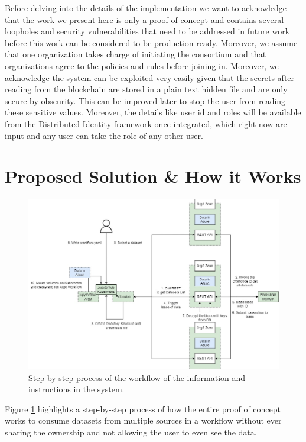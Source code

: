 \bigskip
Before delving into the details of the implementation we want to acknowledge that the work we present here is only a proof of concept and contains several loopholes and security vulnerabilities that need to be addressed in future work before this work can be considered to be production-ready. Moreover, we assume that one organization takes charge of initiating the consortium and that organizations agree to the policies and rules before joining in. Moreover, we acknowledge the system can be exploited very easily given that the secrets after reading from the blockchain are stored in a plain text hidden file and are only secure by obscurity. This can be improved later to stop the user from reading these sensitive values. Moreover, the details like user id and roles will be available from the Distributed Identity framework once integrated, which right now are input and any user can take the role of any other user.

\section{Proposed Solution \& How it Works}

\begin{figure}
    \centering
    \includegraphics[width=14cm,keepaspectratio]{photos/how-it-works-2.jpg}
    \caption{Step by step process of the workflow of the information and instructions in the system.}
    \label{fig:how-it-works}
\end{figure}
Figure \ref{fig:how-it-works} highlights a step-by-step process of how the entire proof of concept works to consume datasets from multiple sources in a workflow without ever sharing the ownership and not allowing the user to even see the data.

